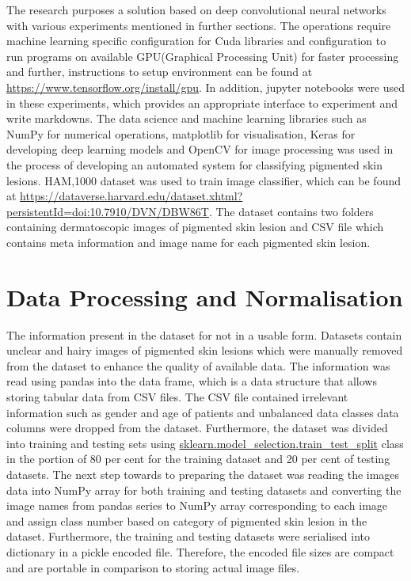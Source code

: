 The research purposes a solution based on deep convolutional neural networks with various experiments mentioned in further sections.
The operations require machine learning specific configuration for Cuda libraries and configuration to run programs on available GPU(Graphical Processing Unit) for faster processing and further, 
instructions to setup environment can be found at \url{https://www.tensorflow.org/install/gpu}. 
In addition, jupyter notebooks were used in these experiments, 
which provides an appropriate interface to experiment and write markdowns.
The data science and machine learning libraries such as NumPy for numerical operations, matplotlib for visualisation, Keras for developing deep learning models and OpenCV for image processing was used in the process of developing an automated system for classifying pigmented skin lesions.
HAM,1000 dataset was used to train image classifier, which can be found at
\url{https://dataverse.harvard.edu/dataset.xhtml?persistentId=doi:10.7910/DVN/DBW86T}. The dataset contains two folders containing dermatoscopic images of pigmented skin lesion and CSV file which contains meta information and image name for each pigmented skin lesion.

\section{Data Processing and Normalisation}
The information present in the dataset for not in a usable form. Datasets contain unclear and hairy images of pigmented skin lesions 
which were manually removed from the dataset to enhance the quality of available data. The information was read using pandas into the data frame, 
which is a data structure that allows storing tabular data from CSV files. The CSV file contained irrelevant information such as gender and age of 
patients and unbalanced data classes data columns were dropped from the dataset. Furthermore, the dataset was divided into training and 
testing sets using \url{sklearn.model_selection.train_test_split} class in the portion of 80 per cent for 
the training dataset and 20 per cent of testing datasets. The next step towards to preparing the dataset was reading the images data into NumPy 
array for both training and testing datasets and converting the image names from pandas series to NumPy array corresponding to each image and assign class number 
based on category of pigmented skin lesion in the dataset. Furthermore, the training and testing datasets were serialised into 
dictionary in a pickle encoded file. Therefore, the encoded file sizes are compact and are portable
in comparison to storing actual image files.


